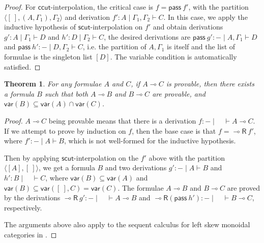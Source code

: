 \documentclass[sn-mathphys-num]{sn-jnl}%
\newcommand{\GG}{\Gamma}
\newcommand{\vd}{\vdash}
\newcommand{\pass}{\mathsf{pass}}
\newcommand{\lolli}{\multimap}
\newcommand{\lleft}{{\lolli}\mathsf{L}}
\newcommand{\lright}{{\lolli}\mathsf{R}}
\newcommand{\vdG}{\vdash}
\newcommand{\mf}[1]{\mathsf{#1}}
\newcommand{\vars}[1]{\mathsf{var}(#1)}
\theoremstyle{thmstyleone}%
\newtheorem{theorem}{Theorem}%
\theoremstyle{thmstyletwo}%
\theoremstyle{thmstylethree}%
\begin{document}
\begin{proof}
For $\mf{ccut}$-interpolation, the critical case is $f = \pass \ f'$, with the partition $\langle [\ ], (A, \GG_1) , \GG_2 \rangle$ and derivation $f' : A \mid \GG_1 , \GG_2 \vdG C$.
In this case, we apply the inductive hypothesis of $\mf{scut}$-interpolation on $f'$ and obtain derivations $g': A \mid \GG_1 \vdG D$ and $h' : D \mid \GG_2 \vdG C$, the desired derivations are $\pass \ g' : {-} \mid A , \GG_1 \vdG D$ and $\pass \ h' : {-} \mid D, \GG_2 \vdG C$, i.e. the partition of $A, \GG_1$ is itself and the list of formulae is the singleton list $[D]$.
The variable condition is automatically satisfied.
\end{proof}
\begin{theorem}
  For any formulae $A$ and $C$, if $A \lolli C$ is provable, then there exists a formula $B$ such that both $A \lolli B$ and $B \lolli C$ are provable, and $\vars{B} \subseteq \vars{A} \cap \vars{C}$.
\end{theorem}
\begin{proof}
$A \lolli C$ being provable means that there is a derivation $f : {-} \mid \quad \vd A \lolli C$. 
If we attempt to prove by induction on $f$, then the base case is that $f = \lright \ f'$, where $f' : {-} \mid A \vd B$, which is not well-formed for the inductive hypothesis.

Then by applying $\mf{scut}$-interpolation on the $f'$ above with the partition $\langle [A ], [\ ]\rangle$, we get a formula $B$ and two derivations $g': {-} \mid A \vdG B$ and $h': B \mid \quad \vdG C$, where $\vars{B}\subseteq \vars{A}$ and $\vars{B} \subseteq \vars{[\ ], C} = \vars{C}$.
The formulae $A \lolli B$ and $B \lolli C$ are proved by the derivations $\lright \ g' : {-} \mid \quad \vd A \lolli B$ and $\lright (\pass \ h') : {-} \mid \quad \vd B \lolli C$, respectively. 

The arguments above also apply to the sequent calculus for left skew monoidal categories in \cite{uustalu:sequent:2021}.
\end{proof}
\end{document}
